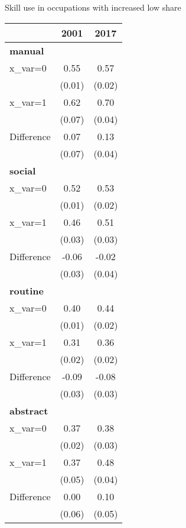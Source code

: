 \begin{center}
\begin{threeparttable}[!h]
\caption{Skill use in occupations with increased low share}
\begin{tabular}{lcc}
\toprule
\toprule
\textbf{}&\multicolumn{1}{c}{\textbf{2001}}&\multicolumn{1}{c}{\textbf{2017}} \\
\midrule
\textbf{manual} \\
x\_var=0             &        0.55&        0.57\\
                    &      (0.01)&      (0.02)\\
x\_var=1             &        0.62&        0.70\\
                    &      (0.07)&      (0.04)\\
Difference          &        0.07&        0.13\\
                    &      (0.07)&      (0.04)\\
\textbf{social} \\
x\_var=0             &        0.52&        0.53\\
                    &      (0.01)&      (0.02)\\
x\_var=1             &        0.46&        0.51\\
                    &      (0.03)&      (0.03)\\
Difference          &       -0.06&       -0.02\\
                    &      (0.03)&      (0.04)\\
\textbf{routine} \\
x\_var=0             &        0.40&        0.44\\
                    &      (0.01)&      (0.02)\\
x\_var=1             &        0.31&        0.36\\
                    &      (0.02)&      (0.02)\\
Difference          &       -0.09&       -0.08\\
                    &      (0.03)&      (0.03)\\
\textbf{abstract} \\
x\_var=0             &        0.37&        0.38\\
                    &      (0.02)&      (0.03)\\
x\_var=1             &        0.37&        0.48\\
                    &      (0.05)&      (0.04)\\
Difference          &        0.00&        0.10\\
                    &      (0.06)&      (0.05)\\
\bottomrule
\bottomrule
\end{tabular}
\end{threeparttable}
\end{center}
